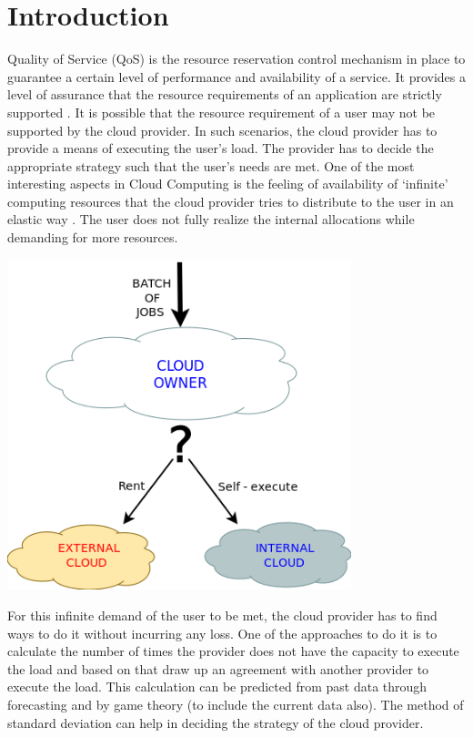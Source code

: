 \chapter{Introduction}
Quality of Service (QoS) is the resource reservation control mechanism in place to guarantee a certain level of performance and availability of a service. It provides a level of assurance that the resource requirements of an application are strictly supported \cite{QOS}. It is possible that the resource requirement of a user may not be supported by the cloud provider. In such 
scenarios, the cloud provider has to provide a means of executing the user's load. The provider has to decide the appropriate strategy such that the user's needs are met. One of the most interesting aspects in Cloud Computing is the feeling of availability of `infinite' computing resources that the cloud provider tries to distribute to the user in an elastic way \cite{RAD}. The user does not fully realize the internal allocations while demanding for more resources.
\begin{center}
\includegraphics[width=0.75\textwidth]{Diagram1}\\[0.3cm]
\end{center}
For this infinite demand of the user to be met, the cloud provider has to find ways to do it without incurring any loss. One of the approaches to do it is to calculate the number of times the provider does not have the capacity to execute the load and based on that draw up an agreement with another provider to execute the load. This calculation can be predicted from past data through forecasting and by game theory (to include the current data also). The method of standard deviation can help in deciding the strategy of the cloud provider.
